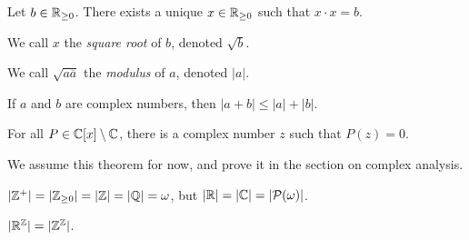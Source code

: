   \begin{prop}
    Let $b\in\mathbb{R}_{\ge 0}$. There exists a unique $x\in\mathbb{R}_{\ge 0}$ such that
    $x\cdot x=b$. 
  \end{prop}
  \begin{defn}
    We call $x$ the \emph{square root} of $b$, denoted $\sqrt b$.
  \end{defn}
  \begin{defn}
    We call $\sqrt{a\overline a}$ the \emph{modulus} of $a$, denoted $|a|$.
  \end{defn}
  \begin{prop}
    If $a$ and $b$ are complex numbers, then $|a+b|\le|a|+|b|$.
  \end{prop}
  \begin{thm}
      For all $P\in\mathbb{C}[x]\setminus\mathbb{C}$, there is a complex number $z$ such that
      $P(z)=0$.
  \end{thm}
  \begin{rem}
      We assume this theorem for now, and prove it in the section on complex
      analysis.
  \end{rem}
  \begin{thm}
    $|\mathbb{Z}^+|=|\mathbb{Z}_{\ge 0}|=|\mathbb{Z}|=|\mathbb{Q}|=\omega$, but $|\mathbb{R}|=|\mathbb{C}|=|\mathcal
    P(\omega)|$.
  \end{thm}
  \begin{prop}
      $|\mathbb{R}^{\mathbb{Z}}|=|\mathbb{Z}^{\mathbb{Z}}|$.
  \end{prop}
